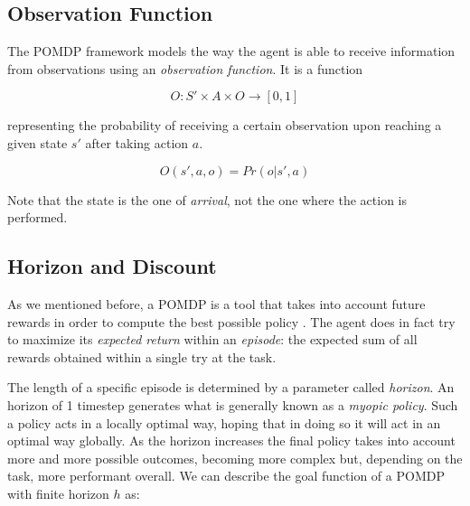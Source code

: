 
\subsection{Observation Function}

The POMDP framework models the way the agent is able to receive information from observations using
an \textit{observation function}. It is a function

\[ O : S' \times A \times O \rightarrow [0,1] \]

representing the probability of receiving a certain observation upon reaching a given state $s'$
after taking action $a$.

\[ O(s', a, o) = Pr(o | s', a) \]

Note that the state is the one of \textit{arrival}, not the one where the action is performed.

\subsection{Horizon and Discount}

As we mentioned before, a POMDP is a tool that takes into account future rewards in order to compute
the best possible policy . The agent does in fact try to maximize its \textit{expected return} within
an \textit{episode}: the expected sum of all rewards obtained within a single try at the task.

The length of a specific episode is determined by a parameter called \textit{horizon}. An horizon of
1 timestep generates what is generally known as a \textit{myopic policy}. Such a policy acts in a
locally optimal way, hoping that in doing so it will act in an optimal way globally. As the horizon
increases the final policy takes into account more and more possible outcomes, becoming more complex
but, depending on the task, more performant overall. We can describe the goal function of a POMDP
with finite horizon $h$ as:

